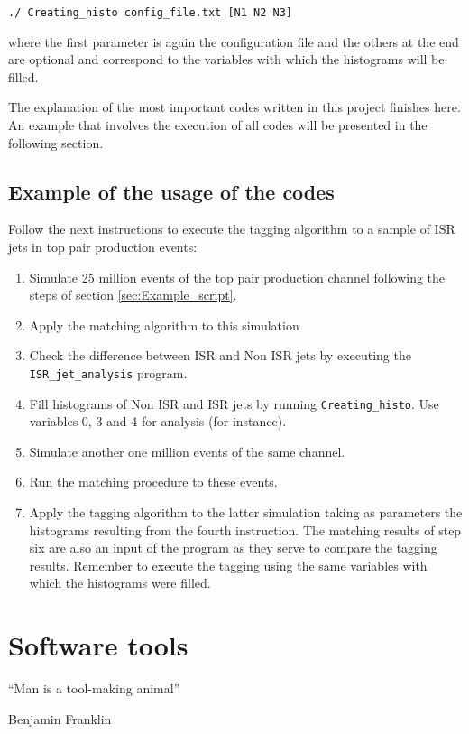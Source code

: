 \documentclass[12pt, oneside]{book}              %
\begin{document}
\noindent \texttt{./ Creating\_histo config\_file.txt [N1 N2 N3]}

where the first parameter is again the configuration file and the others
at the end are optional and correspond to the variables with which the
histograms will be filled.

The explanation of the most important codes written in this
project finishes here. An example that involves the execution
of all codes will be presented in the following section.

\section{Example of the usage of the codes}\label{sec:Example_codes}

Follow the next instructions to execute the tagging algorithm 
to a sample of ISR jets in top pair production events:

\begin{enumerate}
\item Simulate 25 million events of the top pair production channel
following the steps of section \ref{sec:Example_script}.
\item Apply the matching algorithm to this simulation
\item Check the difference between ISR and Non ISR jets by executing
the \texttt{ISR\_jet\_analysis} program.
\item Fill histograms of Non ISR and ISR jets by running \texttt{Creating\_histo}.
Use variables 0, 3 and 4 for analysis (for instance).
\item Simulate another one million events of the same channel.
\item Run the matching procedure to these events.
\item Apply the tagging algorithm to the latter simulation taking
as parameters the histograms resulting from the fourth instruction. The
matching results of step six are also an input of the program as they serve
to compare the tagging results. Remember to execute the tagging using
the same variables with which the histograms were filled.
\end{enumerate}

\chapter{Software tools} \label{cha:Software_tools}

\epigraph{\textquotedblleft Man is a tool-making animal\textquotedblright}{Benjamin Franklin}
\end{document}

